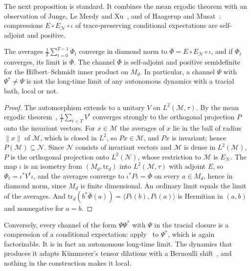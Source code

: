 The next proposition is standard. It combines the mean ergodic theorem with an observation of Junge, Le Merdy and
Xu~\cite[Remark~10.3]{JungeLeMerdyXu2006}, and of Haagerup and Musat~\cite[Remark~5.2]{HaagerupMusat2011}: compressions
$E\circ E_{\mathcal N}\circ\iota$ of trace-preserving conditional expectations are self-adjoint and positive.

\begin{proposition}\label{prop:autonomous}
The averages $\frac1T\sum_{t=0}^{T-1}\Phi_t$ converge in diamond norm to $\overline\Phi=E\circ E_{\mathcal N}\circ\iota$, and if $\Phi_t$ converges, its
limit is $\overline\Phi$. The channel $\overline\Phi$ is self-adjoint and positive semidefinite for the Hilbert--Schmidt inner product on $M_d$. In
particular, a channel $\Psi$ with $\Psi^*\ne\Psi$ is not the long-time limit of any autonomous dynamics with a tracial bath, local or not.
\end{proposition}

\begin{proof}
The automorphism extends to a unitary $V$ on $L^2(\mathcal M,\tau)$. By the mean ergodic theorem~\cite{Krengel1985}, $\frac1T\sum_{t<T}V^t$ converges
strongly to the orthogonal projection $P$ onto the invariant vectors. For $x\in\mathcal M$ the averages of $x$ lie in the ball of radius $\|x\|$ of
$\mathcal M$, which is closed in $L^2$, so $Px\in\mathcal M$, and $Px$ is invariant; hence $P(\mathcal M)\subseteq\mathcal N$. Since
$\mathcal N$ consists of invariant vectors and $\mathcal M$ is dense in $L^2(\mathcal M)$, $P$ is the orthogonal projection onto
$L^2(\mathcal N)$, whose restriction to $\mathcal M$ is $E_{\mathcal N}$. The map $\iota$ is an isometry from $(M_d,\mathrm{tr}_d)$ into
$L^2(\mathcal M,\tau)$ with adjoint $E$, so $\Phi_t=\iota^*V^t\iota$, and the averages converge to $\iota^*P\iota=\overline\Phi$ on every $a\in M_d$,
hence in diamond norm, since $M_d$ is finite dimensional. An ordinary limit equals the limit of the averages. And
$\mathrm{tr}_d(b^*\overline\Phi(a))=\langle P\iota(b),P\iota(a)\rangle$ is Hermitian in $(a,b)$ and nonnegative for $a=b$.
\end{proof}

Conversely, every channel of the form $\Psi\Psi^*$ with $\Psi$ in the tracial closure is a compression of a conditional expectation:
apply~\cite[Theorem~5.9]{HaagerupMusat2011} to $\Psi^*$, which is again factorizable. It is in fact an autonomous long-time limit. The dynamics
that produces it adapts K\"ummerer's tensor dilations with a Bernoulli shift~\cite{Kummerer1985}, and nothing in the construction makes it local.

